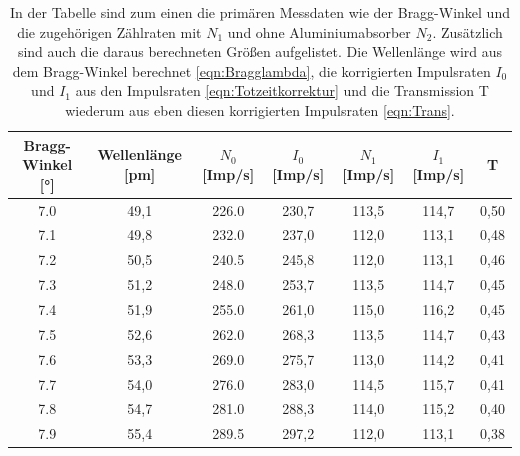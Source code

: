 \documentclass[titlepage = firstcover]{scrartcl}
\begin{document}
    \begin{table}[h]
        \centering
        \caption{In der Tabelle sind zum einen die primären Messdaten wie der Bragg-Winkel und die zugehörigen Zählraten mit $N_1$ und ohne Aluminiumabsorber $N_2$. Zusätzlich sind auch die daraus berechneten Größen aufgelistet. Die Wellenlänge wird aus dem Bragg-Winkel berechnet \ref{eqn:Bragglambda}, die korrigierten Impulsraten $I_0$ und $I_1$ aus den Impulsraten \ref{eqn:Totzeitkorrektur} und die Transmission T wiederum aus eben diesen korrigierten Impulsraten \ref{eqn:Trans}.}
        \label{tab:Transmission}

        \begin{tabular}{c c c c c c c}
            \toprule
            {Bragg-Winkel [°]}  & {Wellenlänge [pm]} & {$N_0$ [Imp/s]} & {$I_0$ [Imp/s]} & {$N_1$ [Imp/s]} & {$I_1$ [Imp/s]} & {T} \\ 
            \midrule
            7.0	                &  49,1              &  226.0          &    230,7       &    113,5        &    114,7       &  0,50 \\
            7.1	                &  49,8              &  232.0          &    237,0       &    112,0        &    113,1       &  0,48 \\
            7.2	                &  50,5              &  240.5          &    245,8       &    112,0        &    113,1       &  0,46 \\
            7.3	                &  51,2              &  248.0          &    253,7       &    113,5        &    114,7       &  0,45 \\
            7.4	                &  51,9              &  255.0          &    261,0       &    115,0        &    116,2       &  0,45 \\
            7.5	                &  52,6              &  262.0          &    268,3       &    113,5        &    114,7       &  0,43 \\
            7.6	                &  53,3              &  269.0          &    275,7       &    113,0        &    114,2       &  0,41 \\
            7.7	                &  54,0              &  276.0          &    283,0       &    114,5        &    115,7       &  0,41 \\
            7.8	                &  54,7              &  281.0          &    288,3       &    114,0        &    115,2       &  0,40 \\
            7.9	                &  55,4              &  289.5          &    297,2       &    112,0        &    113,1       &  0,38 \\

\end{tabular}
\end{table}
\end{document}
